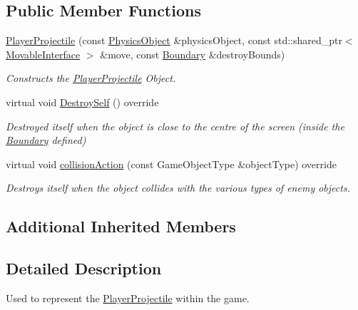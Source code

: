 \subsection*{Public Member Functions}
\begin{DoxyCompactItemize}
\item 
\hyperlink{class_player_projectile_a81e6c16b0d8ce85bad2e8e4b30d2607e}{Player\+Projectile} (const \hyperlink{class_physics_object}{Physics\+Object} \&physics\+Object, const std\+::shared\+\_\+ptr$<$ \hyperlink{class_movable_interface}{Movable\+Interface} $>$ \&move, const \hyperlink{class_boundary}{Boundary} \&destroy\+Bounds)
\begin{DoxyCompactList}\small\item\em Constructs the \hyperlink{class_player_projectile}{Player\+Projectile} Object. \end{DoxyCompactList}\item 
\mbox{\label{class_player_projectile_a05a6c103f9fbae57bfc811e477ab7b5b}} 
virtual void \hyperlink{class_player_projectile_a05a6c103f9fbae57bfc811e477ab7b5b}{Destroy\+Self} () override
\begin{DoxyCompactList}\small\item\em Destroyed itself when the object is close to the centre of the screen (inside the \hyperlink{class_boundary}{Boundary} defined) \end{DoxyCompactList}\item 
virtual void \hyperlink{class_player_projectile_a22fcdd7296d95b97ae60b4d20d8a57bd}{collision\+Action} (const Game\+Object\+Type \&object\+Type) override
\begin{DoxyCompactList}\small\item\em Destroys itself when the object collides with the various types of enemy objects. \end{DoxyCompactList}\end{DoxyCompactItemize}
\subsection*{Additional Inherited Members}


\subsection{Detailed Description}
Used to represent the \hyperlink{class_player_projectile}{Player\+Projectile} within the game. 

